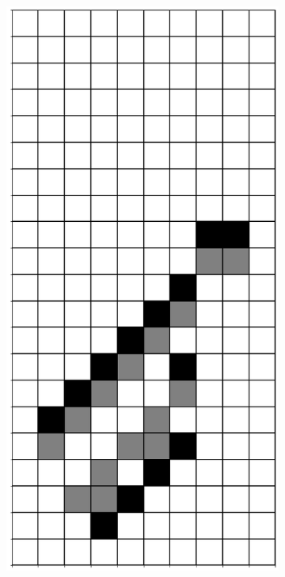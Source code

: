 \documentclass[12pt]{article}
\numberwithin{figure}{section} %
\begin{document}
\begin{figure}[H]
\begin{subfigure}{0.3\textwidth}
     		\subcaption{}
   	\end{subfigure}
     	\begin{subfigure}{0.3\textwidth}
     		\centering
     		\includegraphics[angle=270,width=\linewidth]{Section4/23.1}

\end{subfigure}
\end{figure}
\end{document}
